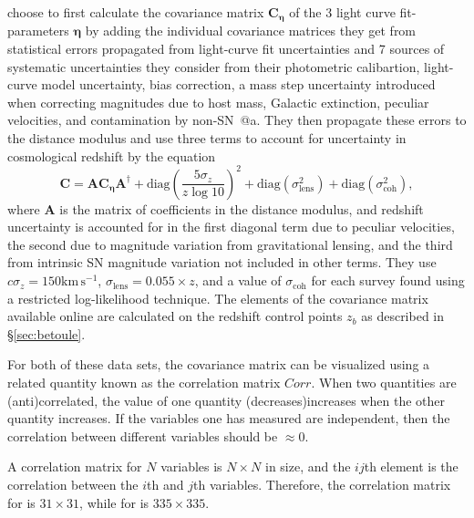 \documentclass[12pt,a4paper]{article}
\makeatletter
\newcommand*{\rom}[1]{\expandafter\@slowromancap\romannumeral #1@}
\newcommand{\sn}{\mbox{SN}}
\newcommand{\sna}{\mbox{SN \rom{1}a}}
\makeatother
\begin{document}
\citet{betoule2014} choose to first calculate the covariance 
matrix $\mathbf{C}_{\mathbf{\eta}}$ of the 3 light curve fit-parameters $\mathbf{\eta}$ 
by adding the individual covariance matrices they get from statistical errors propagated 
from light-curve fit uncertainties and 7 sources of systematic uncertainties 
they consider from their photometric calibartion, light-curve model uncertainty, 
bias correction, a mass step uncertainty introduced when correcting magnitudes due 
to host mass, Galactic extinction, peculiar velocities, and contamination by 
non-\sna{}. They then propagate these errors to the distance modulus and use three 
terms to account for uncertainty in cosmological redshift by the equation
%
\begin{equation}
\label{eq:BetouleCovMatrix}
\mathbf{C} = \mathbf{A} \mathbf{C}_\mathbf{\eta} \mathbf{A}^\dag + \mathrm{diag}\left(\frac{5 \sigma_z}{z \log 10}\right)^2 + \mathrm{diag}\left(\sigma_{\mathrm{lens}}^2\right) + \mathrm{diag}\left(\sigma_{\mathrm{coh}}^2\right),
\end{equation}
%
where $\mathbf{A}$ is the matrix of coefficients in the distance modulus, 
and redshift uncertainty is accounted for in the first diagonal term due to 
peculiar velocities, the second due to magnitude variation from gravitational lensing, 
and the third from intrinsic \sn{} magnitude variation not included in other terms. 
They use $c \sigma_z = 150 \mathrm{km}\, \mathrm{s}^{-1}$, 
$\sigma_{\mathrm{lens}} = 0.055 \times z$, and a value of $\sigma_{\mathrm{coh}}$ for each 
survey found using a restricted log-likelihood technique. The elements of the covariance 
matrix available online are calculated on the redshift control points $z_b$ as 
described in \S \ref{sec:betoule}.

For both of these data sets, the covariance matrix can be visualized using a related
quantity known as the correlation matrix $Corr$. When two quantities are (anti)correlated,
the value of one quantity (decreases)increases when the other quantity increases.
If the variables one has measured are independent, then the correlation between
different variables should be $\approx0$.

A correlation matrix for $N$ variables is $N\times N$ in size, and the $ij$th
element is the correlation between the $i$th and $j$th variables. Therefore, 
the correlation matrix for \citet{betoule2014} is $31\times31$, while
for \citet{rest2014} is $335\times335$.
\end{document}
